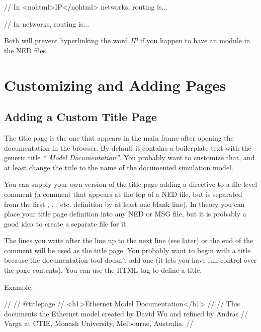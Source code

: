 \begin{ned}
// In <nohtml>IP</nohtml> networks, routing is...
\end{ned}

\begin{ned}
// In \IP networks, routing is...
\end{ned}

Both will prevent hyperlinking the word \textit{IP} if you happen to have
an  module in the NED files.



\section{Customizing and Adding Pages}

\subsection{Adding a Custom Title Page}

The title page is the one that appears in the main frame after
opening the documentation in the browser. By default it contains
a boilerplate text with the generic title \textit{``{\opp} Model Documentation''}.
You probably want to customize that, and at least change the title
to the name of the documented simulation model.

You can supply your own version of the title page adding a 
directive to a file-level comment (a comment that appears at the top of
a NED file, but is separated from the first , ,
, etc. definition by at least one blank line).
In theory you can place your title page definition into
any NED or MSG file, but it is probably a good idea to create
a separate  file for it.

The lines you write after the  line up to the next
 line (see later) or the end of the comment will be used
as the title page.
You probably want to begin with a title because the documentation
tool doesn't add one (it lets you have full control over the
page contents). You can use the  HTML tag
to define a title.

Example:

\begin{ned}
//
// @titlepage
// <h1>Ethernet Model Documentation</h1>
//
// This documents the Ethernet model created by David Wu and refined by Andras
// Varga at CTIE, Monash University, Melbourne, Australia.
//
\end{ned}


